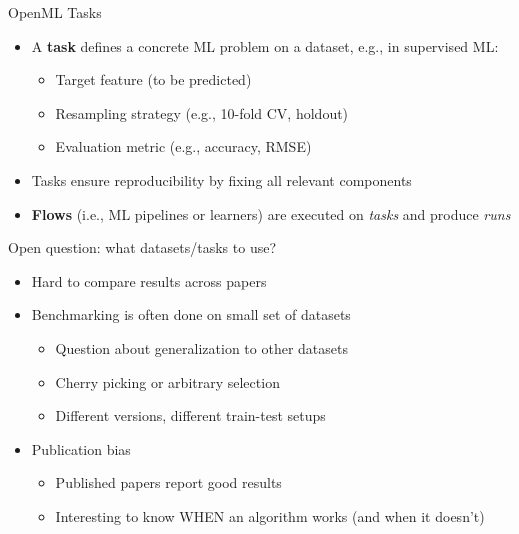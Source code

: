 \documentclass[11pt,compress,t,notes=noshow, aspectratio=169, xcolor=table]{beamer}
\begin{document}
\begin{vbframe}{OpenML Tasks}

\begin{itemize}
    \item A \textbf{task} defines a concrete ML problem on a dataset, e.g., in supervised ML:
    \begin{itemize}
        \item Target feature (to be predicted)
        \item Resampling strategy (e.g., 10-fold CV, holdout)
        \item Evaluation metric (e.g., accuracy, RMSE)
    \end{itemize}
    \item Tasks ensure reproducibility by fixing all relevant components
    \item \textbf{Flows} (i.e., ML pipelines or learners) are executed on \emph{tasks} and produce \emph{runs}
\end{itemize}
\end{vbframe}

\begin{vbframe}{Open question: what datasets/tasks to use?}
\begin{itemize}
    \item Hard to compare results across papers
    \item Benchmarking is often done on small set of datasets
    \begin{itemize}
        \item Question about generalization to other datasets
        \item Cherry picking or arbitrary selection
        \item Different versions, different train-test setups
    \end{itemize}
    \item Publication bias
    \begin{itemize}
        \item Published papers report good results
        \item Interesting to know WHEN an algorithm works (and when it doesn’t)
    \end{itemize}
\end{itemize}
\end{vbframe}
\end{document}
